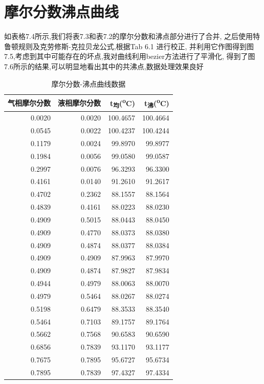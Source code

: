 \documentclass[11pt]{report}
\begin{document}
\section{摩尔分数沸点曲线}
\label{sec:orgcee0405}
如表格7.4所示,我们将表7.3和表7.2的摩尔分数和沸点部分进行了合并,
之后使用特鲁顿规则及克劳修斯-克拉贝龙公式,根据Tab 6.1 进行校正,
并利用它作图得到图7.5,考虑到其中可能存在的坏点,我对曲线利用bezier方法进行了平滑化,
得到了图7.6所示的结果,可以明显地看出其中的共沸点,数据处理效果良好
\begin{table}[htbp]
\caption{\label{tab:orgf03926d}摩尔分数-沸点曲线数据}
\centering
\begin{tabular}{rrrr}
气相摩尔分数 & 液相摩尔分数 & t\textsubscript{均}(\textsuperscript{o}C) & t\textsubscript{沸}(\textsuperscript{o}C)\\
\hline
0.0020 & 0.0020 & 100.4657 & 100.4664\\
0.0545 & 0.0022 & 100.4237 & 100.4244\\
0.1179 & 0.0024 & 99.8970 & 99.8977\\
0.1984 & 0.0056 & 99.0580 & 99.0587\\
0.2997 & 0.0076 & 96.3293 & 96.3300\\
0.4161 & 0.0140 & 91.2610 & 91.2617\\
0.4702 & 0.2362 & 88.1557 & 88.1564\\
0.4839 & 0.4161 & 88.0223 & 88.0230\\
0.4909 & 0.5015 & 88.0443 & 88.0450\\
0.4909 & 0.4770 & 88.0373 & 88.0380\\
0.4909 & 0.4874 & 88.0377 & 88.0384\\
0.4909 & 0.4909 & 87.9963 & 87.9970\\
0.4909 & 0.4874 & 87.9827 & 87.9834\\
0.4944 & 0.4979 & 88.0063 & 88.0070\\
0.4979 & 0.5464 & 88.0267 & 88.0274\\
0.5198 & 0.6479 & 88.3533 & 88.3540\\
0.5464 & 0.7103 & 89.1757 & 89.1764\\
0.5662 & 0.7568 & 90.6583 & 90.6590\\
0.6856 & 0.7839 & 93.1170 & 93.1177\\
0.7675 & 0.7895 & 95.6727 & 95.6734\\
0.7895 & 0.7839 & 97.4327 & 97.4334\\
\end{tabular}
\end{table}
\end{document}
